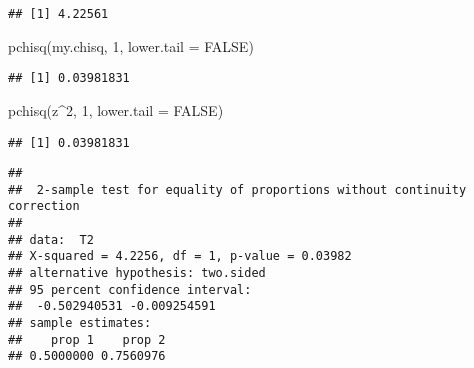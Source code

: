 \documentclass[
]{article}
\newenvironment{Shaded}{\begin{snugshade}}{\end{snugshade}}
\newcommand{\AttributeTok}[1]{\textcolor[rgb]{0.77,0.63,0.00}{#1}}
\newcommand{\CommentTok}[1]{\textcolor[rgb]{0.56,0.35,0.01}{\textit{#1}}}
\newcommand{\ConstantTok}[1]{\textcolor[rgb]{0.00,0.00,0.00}{#1}}
\newcommand{\DecValTok}[1]{\textcolor[rgb]{0.00,0.00,0.81}{#1}}
\newcommand{\DocumentationTok}[1]{\textcolor[rgb]{0.56,0.35,0.01}{\textbf{\textit{#1}}}}
\newcommand{\FunctionTok}[1]{\textcolor[rgb]{0.00,0.00,0.00}{#1}}
\newcommand{\NormalTok}[1]{#1}
\newcommand{\OtherTok}[1]{\textcolor[rgb]{0.56,0.35,0.01}{#1}}
\newcommand{\SpecialCharTok}[1]{\textcolor[rgb]{0.00,0.00,0.00}{#1}}
\begin{document}
\begin{verbatim}
## [1] 4.22561
\end{verbatim}

\begin{Shaded}
\begin{Highlighting}[]
\FunctionTok{pchisq}\NormalTok{(my.chisq, }\DecValTok{1}\NormalTok{, }\AttributeTok{lower.tail =} \ConstantTok{FALSE}\NormalTok{)}
\end{Highlighting}
\end{Shaded}

\begin{verbatim}
## [1] 0.03981831
\end{verbatim}

\begin{Shaded}
\begin{Highlighting}[]
\FunctionTok{pchisq}\NormalTok{(z}\SpecialCharTok{\^{}}\DecValTok{2}\NormalTok{, }\DecValTok{1}\NormalTok{, }\AttributeTok{lower.tail =} \ConstantTok{FALSE}\NormalTok{)}
\end{Highlighting}
\end{Shaded}

\begin{verbatim}
## [1] 0.03981831
\end{verbatim}

\begin{Shaded}
\end{Shaded}

\begin{verbatim}
## 
##  2-sample test for equality of proportions without continuity correction
## 
## data:  T2
## X-squared = 4.2256, df = 1, p-value = 0.03982
## alternative hypothesis: two.sided
## 95 percent confidence interval:
##  -0.502940531 -0.009254591
## sample estimates:
##    prop 1    prop 2 
## 0.5000000 0.7560976
\end{verbatim}
\end{document}
